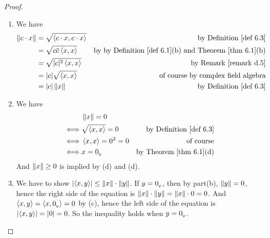 \begin{proof} \ 

\begin{enumerate}
\item We have
\begin{align*}
    \norm{c \cdot x} & = \sqrt{\LG c \cdot x, c \cdot x \RG} & \text{by \DEF{6.3}} \\
        & = \sqrt{c \conjugatet{c} \LG x, x \RG} & \text{by by \DEF{6.1}(b) and \THM{6.1}(b)} \\
        & = \sqrt{\abs{c}^2 \LG x, x \RG} & \text{by \RMK{d.5}} \\
        & = \abs{c} \sqrt{\LG x, x \RG} & \text{of course by complex field algebra} \\
        & = \abs{c} \norm{x} & \text{by \DEF{6.3}}
\end{align*}

\item We have
\begin{align*}
         & \norm{x} = 0 \\
    \iff & \sqrt{\LG x, x \RG} = 0 & \text{by \DEF{6.3}} \\
    \iff & \LG x, x \RG = 0^2 = 0 & \text{of course} \\
    \iff & x = \OV & \text{by \THM{6.1}(d)}
\end{align*}
And \(\left\lVert x\right\rVert \ge 0\) is implied by (d) and (d).

\item We have to show \(\lvert\left< x, y \right>\rvert \le \left\lVert x\right\rVert \cdot \left\lVert y\right\rVert\).
If \(y = 0_{_{\textsf{V}}}\), then by part(b), \(\left\lVert y\right\rVert = 0\), hence the right side of the equation is \(\left\lVert x\right\rVert \cdot \left\lVert y\right\rVert = \left\lVert x\right\rVert \cdot 0 = 0\).
And \(\left< x, y \right> = \left< x, 0_{_{\textsf{V}}} \right> = 0\) by (c), hence the left side of the equation is \(\lvert\left< x, y \right>\rvert = \lvert0\rvert = 0\).
So the inequality holds when \(y = 0_{_{\textsf{V}}}\).


\end{enumerate}
\end{proof}
